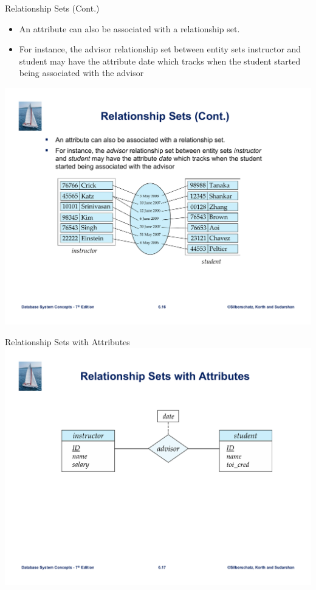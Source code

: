 \documentclass{beamer}
\begin{document}
\begin{frame}{Relationship Sets (Cont.)}
    \begin{itemize}
        \item An attribute can also be associated with a relationship set.
        \item For instance, the advisor relationship set between entity sets instructor and student may have the attribute date which tracks when the student started being associated with the advisor
    \end{itemize}
    \bigskip
    \centering
    \includegraphics[trim={4.80cm 2cm 6.5cm 8cm}, clip, width=\textwidth]{figures/attr_rel}
\end{frame}

\begin{frame}{Relationship Sets with Attributes}
    \vspace{20mm}
    \centering
    \includegraphics[trim={5.10cm 4cm 3.50cm 5.5cm}, clip, width=\textwidth]{figures/attr_rel2}
\end{frame}
\end{document}
